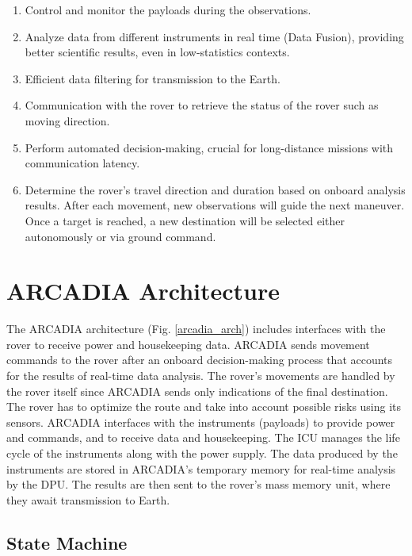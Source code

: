 \documentclass[11pt,twoside]{article}
\begin{document}
\begin{enumerate}
    \item Control and monitor the payloads during the observations.
    \item Analyze data from different instruments in real time (Data Fusion), providing better scientific results, even in low-statistics contexts.
    \item Efficient data filtering for transmission to the Earth.
    \item Communication with the rover to retrieve the status of the rover such as moving direction.
    \item Perform automated decision-making, crucial for long-distance missions with communication latency.
    \item Determine the rover's travel direction and duration based on onboard analysis results. After each movement, new observations will guide the next maneuver. Once a target is reached, a new destination will be selected either autonomously or via ground command.
\end{enumerate}

\section{ARCADIA Architecture}

The ARCADIA architecture (Fig. \ref{arcadia_arch}) includes interfaces with the rover to receive power and housekeeping data. ARCADIA sends movement commands to the rover after an onboard decision-making process that accounts for the results of real-time data analysis. The rover's movements are handled by the rover itself since ARCADIA sends only indications of the final destination. The rover has to optimize the route and take into account possible risks using its sensors. ARCADIA interfaces with the instruments (payloads) to provide power and commands, and to receive data and housekeeping. The ICU manages the life cycle of the instruments along with the power supply. The data produced by the instruments are stored in ARCADIA's temporary memory for real-time analysis by the DPU. The results are then sent to the rover's mass memory unit, where they await transmission to Earth.


\subsection{State Machine}
\end{document}
